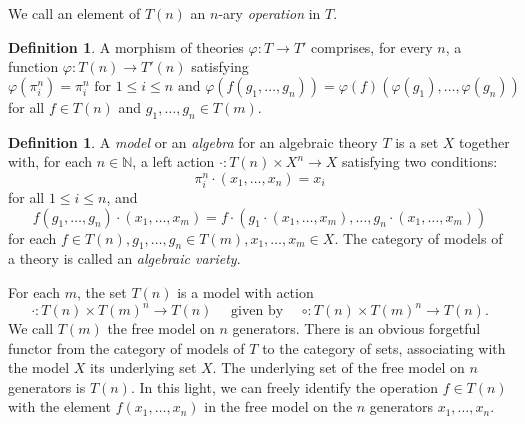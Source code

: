 \documentclass{amsart}
\numberwithin{equation}{section}
\theoremstyle{plain}
\theoremstyle{definition}
\newtheorem{definition}[theorem]{Definition}
\begin{document}
We call an element of $T(n)$ an $n$-ary \emph{operation} in $T$. 

\begin{definition}
  A morphism of theories $\varphi: T \to T'$ comprises, for every $n$, a function $\varphi: T(n) \to T'(n)$ satisfying
\begin{equation}
  \varphi(\pi^n_i) = \pi^n_i \text{ for } 1 \le i \le n  \text{ and } \varphi(f(g_1, \ldots, g_n)) = \varphi(f)(\varphi(g_1), \ldots, \varphi(g_n))
\end{equation}
for all $f \in T(n)$ and $g_1, \ldots, g_n \in T(m)$. 
\end{definition}



\begin{definition}
A \emph{model} or an \emph{algebra} for an algebraic theory $T$ is a set $X$ 
together with, for each $n \in \mathbb{N}$, a left action $\cdot : T(n) \times X^n \to X$ satisfying two conditions: 
  \begin{equation}
    \label{eq:alpha1}
    \pi^n_i \cdot (x_1,\ldots,x_n) = x_i 
  \end{equation}
for all $1 \le i \le n$, and 
  \begin{equation}
    \label{eq:alpha2}
    f(g_1, \ldots, g_n) \cdot (x_1, \ldots, x_m) = f \cdot (g_1 \cdot (x_1, \ldots, x_m), \ldots, g_n \cdot (x_1, \ldots, x_m))
  \end{equation}
  for each $f \in T(n), g_1, \ldots, g_n \in T(m), x_1, \ldots, x_m \in X$.
  The category of models of a theory is called an \emph{algebraic variety}. 
\end{definition}

For each $m$, the set $T(n)$ is a model with action 
\begin{equation*}
  \cdot: T(n) \times T(m)^n \to T(n) \quad \text{ given by } \quad \circ : T(n) \times T(m)^n \to T(n)\text{.} 
\end{equation*}
We call $T(m)$ the free model on $n$ generators.
There is an obvious forgetful functor from the category of models of $T$ to the category of sets, associating with the model $X$ its underlying set $X$.
The underlying set of the free model on $n$ generators is $T(n)$. 
In this light, we can freely identify the operation $f \in T(n)$ with the element $f(x_1, \ldots, x_n)$ in the free model on the $n$ generators $x_1, \ldots, x_n$.
\end{document}
